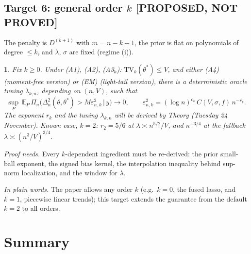\documentclass[11pt]{article}
\newcommand{\E}{\mathbb{E}}
\newcommand{\Dk}{D^{(k+1)}}
\newcommand{\TV}{\mathrm{TV}}
\newcommand{\Post}{\Pi_n}
\newcommand{\stPROPOSED}{\textcolor{proposed}{\textsf{\textbf{[PROPOSED, NOT PROVED]}}}}
\theoremstyle{plain}
\newcommand{\mythmname}{}
\newtheorem*{namedx}{\mythmname}
\newenvironment{named}[1]{\renewcommand{\mythmname}{#1}\begin{namedx}}{\end{namedx}}
\theoremstyle{definition}
\theoremstyle{remark}
\newcommand{\plainly}[1]{\par\smallskip\noindent\textit{In plain words.} #1\par\smallskip}
\begin{document}
\subsection{\texorpdfstring{Target 6: general order $k$ \quad \stPROPOSED}{Target 6: general order k [PROPOSED]}}

The penalty is $\Dk$ with $m=n-k-1$, the prior is flat on polynomials of degree $\le k$, and $\lambda$, $\sigma$ are fixed (regime (i)).

\begin{named}{Target 6 (proposed)}
Fix $k\ge0$. Under (A1), (A2), (A3$_k$): $\TV_k(\theta^*)\le V$, and either (A4) (moment-free version) or (EM) (light-tail version), there is a deterministic oracle tuning $\lambda_{k,n}$, depending on $(n,V)$, such that
\[
\sup_{P}\ \E_P\,\Post\big(\Delta_n^2(\theta,\theta^*)>M\varepsilon_{n,k}^2\,\big|\,y\big)\to0, \qquad \varepsilon_{n,k}^2 = (\log n)^{c_k}\,C(V,\sigma,f)\,n^{-r_k}.
\]
The exponent $r_k$ and the tuning $\lambda_{k,n}$ will be derived by Theory (Tuesday 24 November). Known case, $k=2$: $r_2=5/6$ at $\lambda\asymp n^{5/2}/V$, and $n^{-3/4}$ at the fallback $\lambda\asymp(n^3/V)^{3/4}$.
\end{named}

\noindent\textit{Proof needs.} Every $k$-dependent ingredient must be re-derived: the prior small-ball exponent, the signed bias kernel, the interpolation inequality behind sup-norm localization, and the window for $\lambda$.

\plainly{The paper allows any order $k$ (e.g.\ $k=0$, the fused lasso, and $k=1$, piecewise linear trends); this target extends the guarantee from the default $k=2$ to all orders.}

\section{Summary}
\label{sec:summary}
\end{document}
